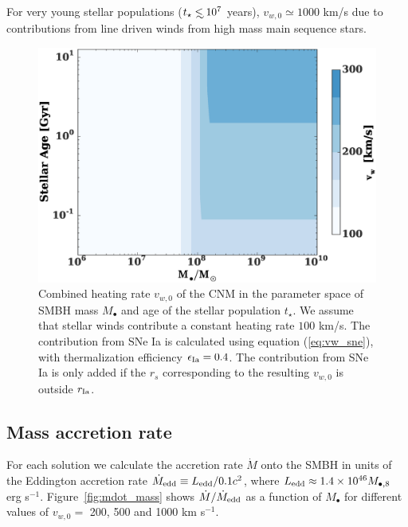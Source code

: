 \documentclass[usenatbib,fleqn]{mn2e}
\newcommand\lsim{\mathrel{\rlap{\lower4pt\hbox{\hskip1pt$\sim$}}
    \raise1pt\hbox{$<$}}}
\newcommand{\Mbh}[1][]{M_{\bullet#1}}
\newcommand{\rIa}{r_{\rm Ia}}
\newcommand{\vwO}{v_{w,0}}
\newcommand{\tage}{t_{\star}}
\begin{document}
  For very young stellar populations ($\tage \lsim 10^7$ years),
  $\vwO\simeq 1000$ km/s due to contributions from line driven winds
  from high mass main sequence stars.

  \begin{figure}
    \includegraphics[width=\columnwidth]{vw-contour.eps}
    \caption{\label{fig:vweff} Combined heating rate $\vwO$ of the CNM
      in the parameter space of SMBH mass $\Mbh$ and age of the
      stellar population $t_{\star}$.  We assume that stellar winds
      contribute a constant heating rate $100$ km/s. The contribution
      from SNe Ia is calculated using equation (\ref{eq:vw_sne}), with
      thermalization efficiency $\epsilon_{\rm Ia}=0.4$. The
      contribution from SNe Ia is only added if the $r_s$
      corresponding to the resulting $\vwO$ is outside
      $\rIa$.}%
  \end{figure}


\subsection{Mass accretion rate}

For each solution we calculate the accretion rate $\dot{M}$ onto the
SMBH in units of the Eddington accretion rate $\dot{M}_{\rm edd}
\equiv L_{\rm edd}/0.1 c^{2}$, where $L_{\rm edd} \approx 1.4\times
10^{46}M_{\bullet,8}$ erg s$^{-1}$.  Figure~\ref{fig:mdot_mass} shows
$\dot{M}/\dot{M}_{\rm edd}$ as a function of $\Mbh$ for different
values of $\vwO =$ 200, 500 and 1000 km s$^{-1}$.
\end{document}
